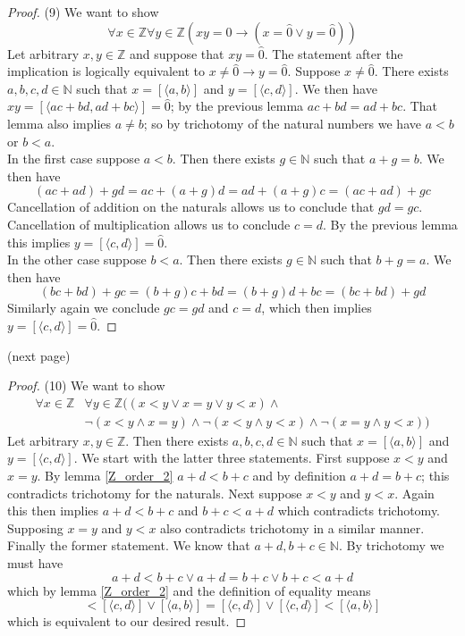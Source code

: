 \documentclass{report}
\begin{document}
\begin{proof}(9)
We want to show
\begin{equation*}
\forall x\in\mathbb Z\forall y\in\mathbb Z(xy=\hat0\to(x=\hat0\lor y=\hat0))
\end{equation*}
Let arbitrary $x,y\in\mathbb Z$ and suppose that $xy=\hat0$. The statement after the implication is logically equivalent to $x\neq\hat0\to y=\hat0$.
Suppose $x\neq\hat0$. There exists $a,b,c,d\in\mathbb N$ such that $x=[\langle a,b\rangle]$ and $y=[\langle c,d\rangle]$. We then have $xy=[\langle ac+bd,ad+bc\rangle]=\hat0$; 
by the previous lemma $ac+bd=ad+bc$. That lemma also implies $a\neq b$; so by trichotomy of the natural numbers we have $a<b$ or $b<a$.\\
\indent In the first case suppose $a<b$. Then there exists $g\in\mathbb N$ such that $a+g=b$. We then have
\begin{equation*}
(ac+ad)+gd=ac+(a+g)d=ad+(a+g)c=(ac+ad)+gc
\end{equation*}
Cancellation of addition on the naturals allows us to conclude that $gd=gc$. Cancellation of multiplication allows us to conclude $c=d$. By the previous lemma this implies 
$y=[\langle c,d\rangle]=\hat0$.\\
\indent In the other case suppose $b<a$. Then there exists $g\in\mathbb N$ such that $b+g=a$.
We then have
\begin{equation*}
(bc+bd)+gc=(b+g)c+bd=(b+g)d+bc=(bc+bd)+gd
\end{equation*}
Similarly again we conclude $gc=gd$ and $c=d$, which then implies $y=[\langle c,d\rangle]=\hat0$.
\end{proof}
\noindent(next page)\newpage
\begin{proof}(10)
We want to show
\begin{align*}
\forall x\in\mathbb Z&\forall y\in\mathbb Z((x<y\lor x=y\lor y<x)\land\\
&\neg(x<y\land x=y)\land\neg(x<y\land y<x)\land\neg(x=y\land y<x))
\end{align*}
Let arbitrary $x,y\in\mathbb Z$. Then there exists $a,b,c,d\in\mathbb N$ such that $x=[\langle a,b\rangle]$ and $y=[\langle c,d\rangle]$.
We start with the latter three statements. First suppose $x<y$ and $x=y$.
By lemma \ref{Z_order_2} $a+d<b+c$ and by definition $a+d=b+c$; this contradicts trichotomy for the naturals. Next suppose $x<y$ and $y<x$. Again
this then implies $a+d<b+c$ and $b+c<a+d$ which contradicts trichotomy.
Supposing $x=y$ and $y<x$ also contradicts trichotomy in a similar manner.\\
\indent Finally the former statement. We know that $a+d,b+c\in\mathbb N$.
By trichotomy we must have
\begin{equation*}
a+d<b+c\lor a+d=b+c\lor b+c<a+d
\end{equation*}
which by lemma \ref{Z_order_2} and the definition of equality means
\begin{equation*}
[\langle a,b\rangle]<[\langle c,d\rangle]\lor[\langle a,b\rangle]=[\langle c,d\rangle]\lor[\langle c,d\rangle]<[\langle a,b\rangle]
\end{equation*}
which is equivalent to our desired result.
\end{proof}
\end{document}
